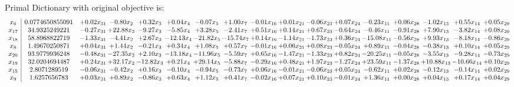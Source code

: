 \documentclass[9pt]{article}
\begin{document}
Primal Dictionary with original objective is:
\[\begin{array}{c| c c@{\hskip 2pt} c@{\hskip 2pt} c@{\hskip 2pt} c@{\hskip 2pt} c@{\hskip 2pt} c@{\hskip 2pt} c@{\hskip 2pt} c@{\hskip 2pt} c@{\hskip 2pt} c@{\hskip 2pt} c@{\hskip 2pt} c@{\hskip 2pt} c@{\hskip 2pt} c@{\hskip 2pt} c@{\hskip 2pt} }
 x_{6}   &  0.0774650855091 & +  0.02 x_{31} & -0.80 x_{2} & +  0.32 x_{3} & +  0.04 x_{4} & -0.07 x_{5} & +  1.00 x_{7} & -0.01 x_{16} & +  0.01 x_{21} & -0.06 x_{23} & +  0.07 x_{24} & -0.23 x_{11} & +  0.06 x_{28} & -1.02 x_{13} & +  0.55 x_{14} & +  0.05 x_{29}\\
 x_{17}   &  34.9325249221 & -0.27 x_{31} & + 22.88 x_{2} & -9.27 x_{3} & -5.85 x_{4} & +  3.28 x_{5} & -2.41 x_{7} & +  0.51 x_{16} & +  0.14 x_{21} & +  0.67 x_{23} & -0.64 x_{24} & -0.46 x_{11} & -0.91 x_{28} & +  7.90 x_{13} & -3.82 x_{14} & +  0.08 x_{29}\\
 x_{18}   &  58.8968822719 & -1.33 x_{31} & -4.41 x_{2} & +  2.67 x_{3} & -12.13 x_{4} & -21.82 x_{5} & -15.74 x_{7} & +  0.14 x_{16} & -1.14 x_{21} & -1.73 x_{23} & +  0.36 x_{24} & -15.08 x_{11} & -0.56 x_{28} & +  9.93 x_{13} & -8.18 x_{14} & -0.86 x_{29}\\
 x_{8}   &  1.49670250871 & +  0.04 x_{31} & +  1.44 x_{2} & -0.21 x_{3} & +  0.34 x_{4} & +  1.08 x_{5} & +  0.57 x_{7} & -0.01 x_{16} & +  0.06 x_{21} & +  0.08 x_{23} & -0.05 x_{24} & +  0.89 x_{11} & -0.04 x_{28} & -0.38 x_{13} & +  0.10 x_{14} & +  0.05 x_{29}\\
 x_{20}   &  93.9779936248 & -0.48 x_{31} & -27.35 x_{2} & +  2.10 x_{3} & -13.18 x_{4} & -11.96 x_{5} & -5.59 x_{7} & +  0.65 x_{16} & -1.47 x_{21} & -1.33 x_{23} & +  0.82 x_{24} & -20.25 x_{11} & -0.05 x_{28} & -3.55 x_{13} & -9.28 x_{14} & -0.73 x_{29}\\
 x_{19}   &  32.0204694487 & +  0.24 x_{31} & + 32.17 x_{2} & -12.82 x_{3} & +  0.21 x_{4} & + 29.14 x_{5} & -5.88 x_{7} & -0.29 x_{16} & +  0.48 x_{21} & +  1.97 x_{23} & -1.27 x_{24} & + 23.59 x_{11} & -1.37 x_{28} & + 10.88 x_{13} & -10.66 x_{14} & +  0.10 x_{29}\\
 x_{15}   &  2.8071289519 & -0.06 x_{31} & -0.42 x_{2} & +  0.16 x_{3} & -0.10 x_{4} & -0.94 x_{5} & -0.73 x_{7} & +  0.06 x_{16} & -0.01 x_{21} & -0.06 x_{23} & +  0.05 x_{24} & -0.62 x_{11} & +  0.02 x_{28} & -0.12 x_{13} & -0.14 x_{14} & +  0.02 x_{29}\\
 x_{9}   &  1.6257656783 & +  0.03 x_{31} & +  0.89 x_{2} & -0.86 x_{3} & +  0.63 x_{4} & +  1.12 x_{5} & +  0.41 x_{7} & -0.02 x_{16} & +  0.07 x_{21} & +  0.10 x_{23} & -0.01 x_{24} & +  1.36 x_{11} & +  0.00 x_{28} & +  0.04 x_{13} & +  0.17 x_{14} & +  0.04 x_{29}\\

\end{array}\]
\end{document}
